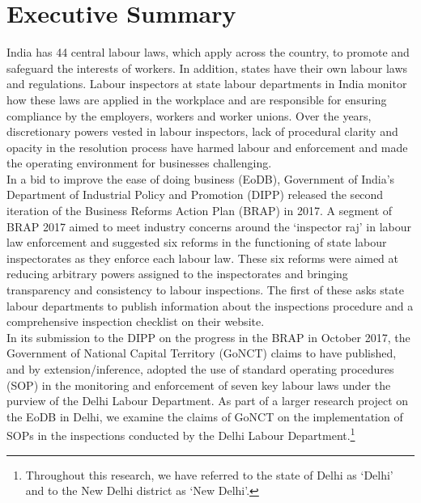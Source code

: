 \documentclass[a4paper, 12pt, twoside]{article}
\begin{document}
\newpage
\section*{Executive Summary}

India has 44 central labour laws, which apply across the country, to promote and safeguard the interests of workers. In addition, states have their own labour laws and regulations. Labour inspectors at state labour departments in India monitor how these laws are applied in the workplace and are responsible for ensuring compliance by the employers, workers and worker unions. Over the years, discretionary powers vested in labour inspectors, lack of procedural clarity and opacity in the resolution process have harmed labour and enforcement and made the operating environment for businesses challenging. \\

In a bid to improve the ease of doing business (EoDB), Government of India’s Department of Industrial Policy and Promotion (DIPP) released the second iteration of the Business Reforms Action Plan (BRAP) in 2017. A segment of BRAP 2017 aimed to meet industry concerns around the ‘inspector raj’ in labour law enforcement and suggested six reforms in the functioning of state labour inspectorates as they enforce each labour law. These six reforms were aimed at reducing arbitrary powers assigned to the inspectorates and bringing transparency and consistency to labour inspections. The first of these asks state labour departments to publish information about the inspections procedure and a comprehensive inspection checklist on their website. \\

In its submission to the DIPP on the progress in the BRAP in October 2017, the Government of National Capital Territory (GoNCT) claims to have published, and by extension/inference, adopted the use of standard operating procedures (SOP) in the monitoring and enforcement of seven key labour laws under the purview of the Delhi Labour Department. As part of a larger research project on the EoDB in Delhi, we examine the claims of GoNCT on the implementation of SOPs in the inspections conducted by the Delhi Labour Department.\footnote{Throughout this research, we have referred to the state of Delhi as ‘Delhi’ and to the New Delhi district as ‘New Delhi’.} \\
\end{document}
